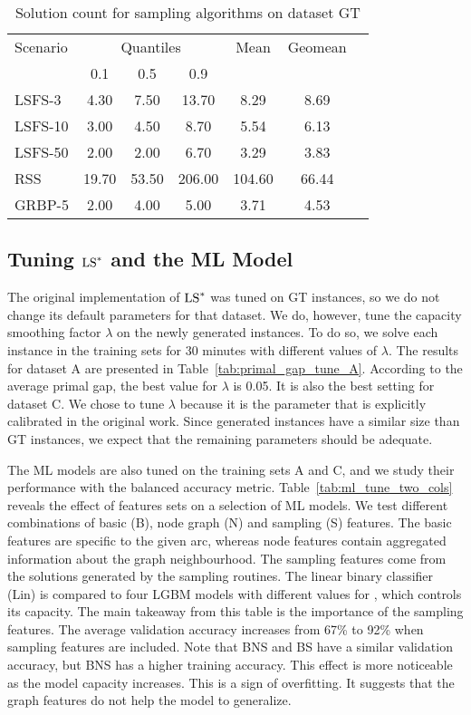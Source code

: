 \documentclass[3p, authoryear, times, doubleblind]{elsarticle}
\begin{document}
{\begin{table}[h]
\centering
\caption{Solution count for sampling algorithms on dataset GT}
\label{tab:cb_sol_count_samplingGT}
\begin{tabular}{lcccccc}
\toprule
{Scenario} & \multicolumn{3}{c}{Quantiles} & {Mean} & {Geomean} \\
{} & {0.1} & {0.5} & {0.9} & {} & {} \\
\midrule
LSFS-3 & 4.30 & 7.50 & 13.70 & 8.29 & 8.69 \\
LSFS-10 & 3.00 & 4.50 & 8.70 & 5.54 & 6.13 \\
LSFS-50 & 2.00 & 2.00 & 6.70 & 3.29 & 3.83 \\
RSS & 19.70 & 53.50 & 206.00 & 104.60 & 66.44 \\
GRBP-5 & 2.00 & 4.00 & 5.00 & 3.71 & 4.53 \\
\bottomrule
\end{tabular}
\end{table}



\subsection{Tuning $\text{LS}^*$ and the ML Model} \label{sec:tuning}
The original implementation of $\text{LS}^*$ was tuned on GT instances, so we do not change its default parameters for that dataset. We do, however, tune the capacity smoothing factor $\lambda$ on the newly generated instances. To do so, we solve each instance in the training sets for 30 minutes with different values of $\lambda$. The results for dataset A are presented in Table~\ref{tab:primal_gap_tune_A}. According to the average primal gap, the best value for $\lambda$ is 0.05. It is also the best setting for dataset C. We chose to tune $\lambda$ because it is the parameter that is explicitly calibrated in the original work. Since generated instances have a similar size than GT instances, we expect that the remaining parameters should be adequate. 


The ML models are also tuned on the training sets A and C, and we study their performance  with the balanced accuracy metric. Table~\ref{tab:ml_tune_two_cols} reveals the effect of features sets on a selection of ML models. We test different combinations of basic (B), node graph (N) and sampling (S) features.  The basic features are specific to the given arc, whereas node features contain aggregated information about the graph neighbourhood. The sampling features come from the solutions generated by the sampling routines. The linear binary classifier (Lin) is compared to four LGBM models with different values for , which controls its capacity. The main takeaway from this table is the importance of the sampling features. The average validation accuracy increases from 67\% to 92\% when sampling features are included. Note that BNS and BS have a similar validation accuracy, but BNS has a higher training accuracy. This effect is more noticeable as the model capacity increases. This is a sign of overfitting. It suggests that the graph features do not help the model to generalize. 

}
\end{document}
